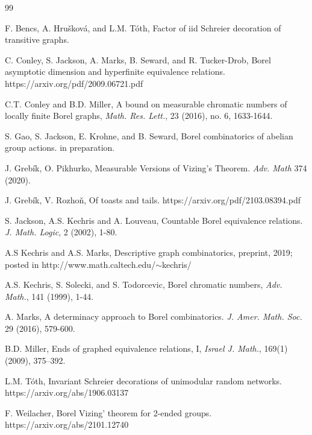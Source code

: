 \begin{thebibliography}{99}

 F. Bencs, A. Hru\v{s}kov\'{a}, and L.M. T\'{o}th, Factor of iid Schreier decoration of transitive graphs.

 C. Conley, S. Jackson, A. Marks, B. Seward, and R. Tucker-Drob, Borel asymptotic dimension and hyperfinite equivalence relations. https://arxiv.org/pdf/2009.06721.pdf

 C.T. Conley and B.D. Miller, A bound on measurable chromatic numbers of locally finite Borel graphs, \textit{Math. Res. Lett.}, 23 (2016), no. 6, 1633-1644.

 S. Gao, S. Jackson, E. Krohne, and B. Seward, Borel combinatorics of abelian group actions. in preparation.

 J. Greb\'{i}k, O. Pikhurko, Measurable Versions of Vizing's Theorem. \textit{Adv. Math} 374 (2020).

 J. Greb\'{i}k, V. Rozho\v{n}, Of toasts and tails. \textnormal{https://arxiv.org/pdf/2103.08394.pdf}

 S. Jackson, A.S. Kechris and A. Louveau, Countable Borel equivalence relations. \textit{J. Math. Logic}, 2 (2002), 1-80.

 A.S Kechris and A.S. Marks, Descriptive graph combinatorics, preprint, 2019; posted in \textnormal{http://www.math.caltech.edu/$\sim$kechris/}

 A.S. Kechris, S. Solecki, and S. Todorcevic, Borel chromatic numbers, \textit{Adv. Math.}, 141 (1999), 1-44.

 A. Marks, A determinacy approach to Borel combinatorics. \textit{J. Amer. Math. Soc.} 29 (2016), 579-600.

 B.D. Miller, Ends of graphed equivalence relations, I, \textit{Israel J.
Math.}, 169(1) (2009), 375–392.

 L.M. T\'{o}th, Invariant Schreier decorations of unimodular random networks. https://arxiv.org/abs/1906.03137

 F. Weilacher, Borel Vizing' theorem for 2-ended groups. https://arxiv.org/abs/2101.12740



\end{thebibliography}